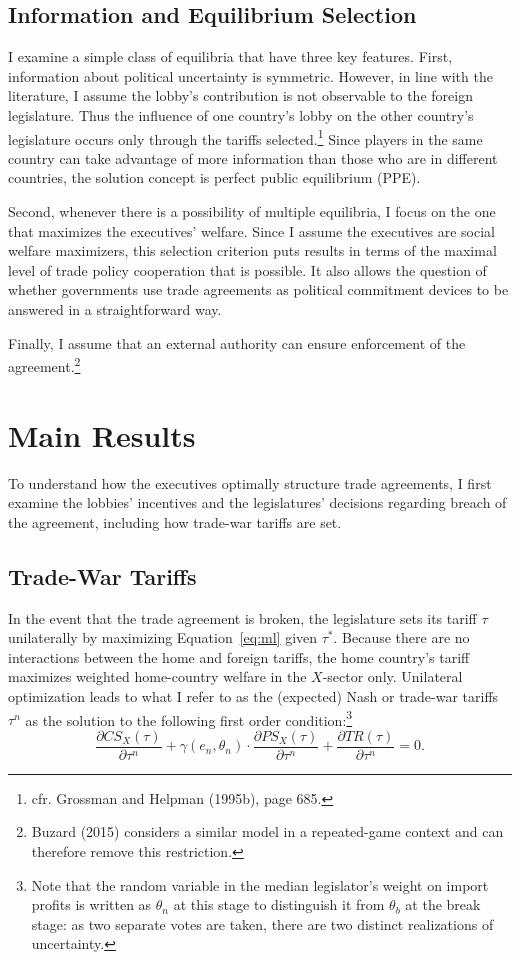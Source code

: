 \documentclass[10pt]{article}
\newcommand{\ve}{\theta}
\newcommand{\ta}{\theta}
\newcommand{\ga}{\gamma}
\begin{document}
\subsection{Information and Equilibrium Selection}
\label{sec:info}
I examine a simple class of equilibria that have three key features. First, information about political uncertainty is symmetric. However, in line with the literature, I assume the lobby's contribution is not observable to the foreign legislature. Thus the influence of one country's lobby on the other country's legislature occurs only through the tariffs selected.\footnote{cfr. Grossman and Helpman (1995b), page 685.} Since players in the same country can take advantage of more information than those who are in different countries, the solution concept is perfect public equilibrium (PPE).

Second, whenever there is a possibility of multiple equilibria, I focus on the one that maximizes the executives' welfare. Since I assume the executives are social welfare maximizers, this selection criterion puts results in terms of the maximal level of trade policy cooperation that is possible. It also allows the question of whether governments use trade agreements as political commitment devices to be answered in a straightforward way.

Finally, I assume that an external authority can ensure enforcement of the agreement.\footnote{Buzard (2015) considers a similar model in a repeated-game context and can therefore remove this restriction.} 


\section{Main Results}
\label{sec:main}
To understand how the executives optimally structure trade agreements, I first examine the lobbies' incentives and the legislatures' decisions regarding breach of the agreement, including how trade-war tariffs are set.

\subsection{Trade-War Tariffs}
\label{sec:twt}
In the event that the trade agreement is broken, the legislature sets its tariff $\tau$ unilaterally by maximizing Equation~\ref{eq:ml} given $\tau^*$. Because there are no interactions between the home and foreign tariffs, the home country's tariff maximizes weighted home-country welfare in the $X$-sector only. Unilateral optimization leads to what I refer to as the (expected) Nash or trade-war tariffs $\tau^n$ as the solution to the following first order condition:\footnote{Note that the random variable in the median legislator's weight on import profits is written as $\ta_n$ at this stage to distinguish it from $\ta_b$ at the break stage: as two separate votes are taken, there are two distinct realizations of uncertainty.}
\begin{equation}
		\frac{\partial \mathit{CS}_X(\tau)}{\partial \tau^n} + \ga(e_n,\ve_n) \cdot \frac{\partial \mathit{PS}_X(\tau)}{\partial \tau^n} +  \frac{\partial \mathit{TR}(\tau)}{\partial \tau^n} = 0 .
		\label{eq:legfoc}
\end{equation}
\end{document}
